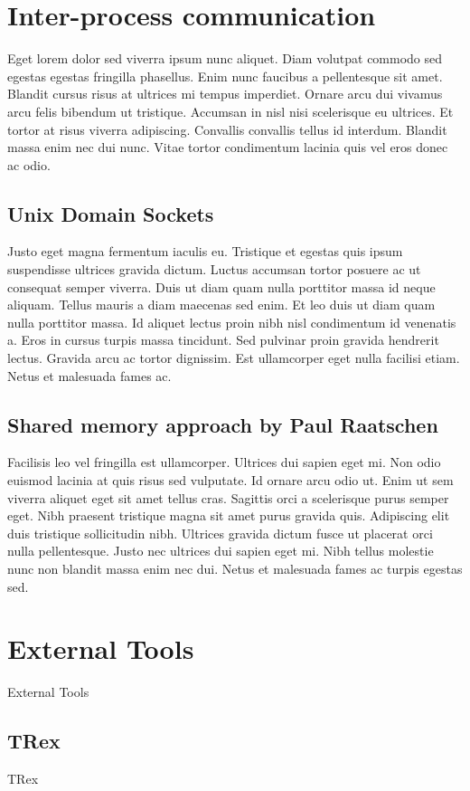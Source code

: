 \section{Inter-process communication}
Eget lorem dolor sed viverra ipsum nunc aliquet. Diam volutpat commodo sed egestas egestas fringilla phasellus. Enim nunc faucibus a pellentesque sit amet. Blandit cursus risus at ultrices mi tempus imperdiet. Ornare arcu dui vivamus arcu felis bibendum ut tristique. Accumsan in nisl nisi scelerisque eu ultrices. Et tortor at risus viverra adipiscing. Convallis convallis tellus id interdum. Blandit massa enim nec dui nunc. Vitae tortor condimentum lacinia quis vel eros donec ac odio.

\subsection{Unix Domain Sockets}
Justo eget magna fermentum iaculis eu. Tristique et egestas quis ipsum suspendisse ultrices gravida dictum. Luctus accumsan tortor posuere ac ut consequat semper viverra. Duis ut diam quam nulla porttitor massa id neque aliquam. Tellus mauris a diam maecenas sed enim. Et leo duis ut diam quam nulla porttitor massa. Id aliquet lectus proin nibh nisl condimentum id venenatis a. Eros in cursus turpis massa tincidunt. Sed pulvinar proin gravida hendrerit lectus. Gravida arcu ac tortor dignissim. Est ullamcorper eget nulla facilisi etiam. Netus et malesuada fames ac.

\subsection{Shared memory approach by Paul Raatschen}
Facilisis leo vel fringilla est ullamcorper. Ultrices dui sapien eget mi. Non odio euismod lacinia at quis risus sed vulputate. Id ornare arcu odio ut. Enim ut sem viverra aliquet eget sit amet tellus cras. Sagittis orci a scelerisque purus semper eget. Nibh praesent tristique magna sit amet purus gravida quis. Adipiscing elit duis tristique sollicitudin nibh. Ultrices gravida dictum fusce ut placerat orci nulla pellentesque. Justo nec ultrices dui sapien eget mi. Nibh tellus molestie nunc non blandit massa enim nec dui. Netus et malesuada fames ac turpis egestas sed.

\section{External Tools}
External Tools

\subsection{TRex}
TRex
